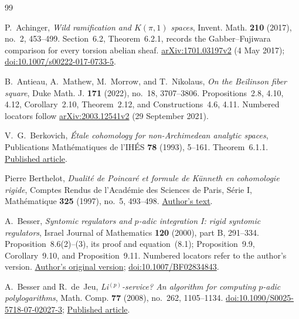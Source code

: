 \documentclass[11pt,a4paper]{amsart}
\numberwithin{equation}{section}
\theoremstyle{definition}
\theoremstyle{remark}
\begin{document}
\begin{thebibliography}{99}

P.~Achinger, \emph{Wild ramification and $K(\pi,1)$ spaces},
Invent. Math. \textbf{210} (2017), no.~2, 453--499.
Section~6.2, Theorem~6.2.1, records the Gabber--Fujiwara comparison
for every torsion abelian sheaf.
\href{https://arxiv.org/abs/1701.03197v2}{arXiv:1701.03197v2}
(4 May 2017);
\href{https://doi.org/10.1007/s00222-017-0733-5}{doi:10.1007/s00222-017-0733-5}.

B.~Antieau, A.~Mathew, M.~Morrow, and T.~Nikolaus,
\emph{On the Beilinson fiber square},
Duke Math. J. \textbf{171} (2022), no.~18, 3707--3806.
Propositions~2.8, 4.10, 4.12, Corollary~2.10, Theorem~2.12,
and Constructions~4.6, 4.11.
Numbered locators follow
\href{https://arxiv.org/abs/2003.12541v2}{arXiv:2003.12541v2}
(29 September 2021).

V.~G.~Berkovich, \emph{\'Etale cohomology for non-Archimedean analytic spaces},
Publications Math\'ematiques de l'IH\'ES \textbf{78} (1993), 5--161.
Theorem~6.1.1.
\href{https://www.numdam.org/article/PMIHES_1993__78__5_0.pdf}{Published article}.

Pierre Berthelot,
\emph{Dualit\'e de Poincar\'e et formule de K\"unneth en cohomologie rigide},
Comptes Rendus de l'Acad\'emie des Sciences de Paris,
S\'erie I, Math\'ematique \textbf{325} (1997), no.~5, 493--498.
\href{https://wstein.org/people/berthelo/publis/Poincare_Kunneth.pdf}{Author's text}.

A.~Besser, \emph{Syntomic regulators and $p$-adic integration I:
rigid syntomic regulators}, Israel Journal of Mathematics
\textbf{120} (2000), part B, 291--334.
Proposition~8.6(2)--(3), its proof and equation~(8.1);
Proposition~9.9, Corollary~9.10, and Proposition~9.11.
Numbered locators refer to the author's version.
\href{https://www.math.bgu.ac.il/~bessera/reg/reg.html}{Author's original version};
\href{https://doi.org/10.1007/BF02834843}{doi:10.1007/BF02834843}.

A.~Besser and R.~de~Jeu, \emph{Li$^{(p)}$-service? An algorithm for computing $p$-adic polylogarithms}, Math. Comp. \textbf{77} (2008), no.~262, 1105--1134.
\href{https://doi.org/10.1090/S0025-5718-07-02027-3}{doi:10.1090/S0025-5718-07-02027-3};
\href{https://research.vu.nl/ws/portalfiles/portal/2459860/220267.pdf}{Published article}.


\end{thebibliography}
\end{document}
